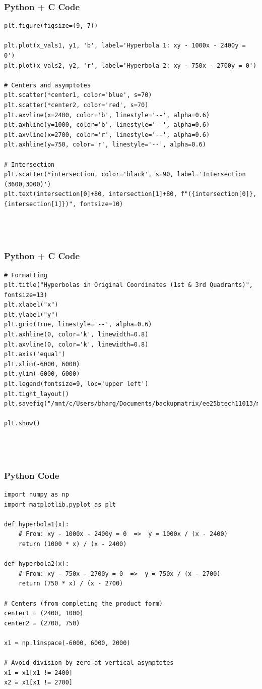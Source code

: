 \documentclass{beamer}
\begin{document}
\begin{frame}[fragile]
    \frametitle{Python + C Code}
    \begin{lstlisting}
plt.figure(figsize=(9, 7))

plt.plot(x_vals1, y1, 'b', label='Hyperbola 1: xy - 1000x - 2400y = 0')
plt.plot(x_vals2, y2, 'r', label='Hyperbola 2: xy - 750x - 2700y = 0')

# Centers and asymptotes
plt.scatter(*center1, color='blue', s=70)
plt.scatter(*center2, color='red', s=70)
plt.axvline(x=2400, color='b', linestyle='--', alpha=0.6)
plt.axhline(y=1000, color='b', linestyle='--', alpha=0.6)
plt.axvline(x=2700, color='r', linestyle='--', alpha=0.6)
plt.axhline(y=750, color='r', linestyle='--', alpha=0.6)

# Intersection
plt.scatter(*intersection, color='black', s=90, label='Intersection (3600,3000)')
plt.text(intersection[0]+80, intersection[1]+80, f"({intersection[0]}, {intersection[1]})", fontsize=10)




    \end{lstlisting}
\end{frame}
\begin{frame}[fragile]
    \frametitle{Python + C Code}
    \begin{lstlisting}
# Formatting
plt.title("Hyperbolas in Original Coordinates (1st & 3rd Quadrants)", fontsize=13)
plt.xlabel("x")
plt.ylabel("y")
plt.grid(True, linestyle='--', alpha=0.6)
plt.axhline(0, color='k', linewidth=0.8)
plt.axvline(0, color='k', linewidth=0.8)
plt.axis('equal')
plt.xlim(-6000, 6000)
plt.ylim(-6000, 6000)
plt.legend(fontsize=9, loc='upper left')
plt.tight_layout()
plt.savefig("/mnt/c/Users/bharg/Documents/backupmatrix/ee25btech11013/matgeo/12.27/figs/Figure_1.png")

plt.show()




    \end{lstlisting}
\end{frame}
\begin{frame}[fragile]
    \frametitle{Python Code}
    \begin{lstlisting}
import numpy as np
import matplotlib.pyplot as plt

def hyperbola1(x):
    # From: xy - 1000x - 2400y = 0  =>  y = 1000x / (x - 2400)
    return (1000 * x) / (x - 2400)

def hyperbola2(x):
    # From: xy - 750x - 2700y = 0  =>  y = 750x / (x - 2700)
    return (750 * x) / (x - 2700)

# Centers (from completing the product form)
center1 = (2400, 1000)
center2 = (2700, 750)

x1 = np.linspace(-6000, 6000, 2000)

# Avoid division by zero at vertical asymptotes
x1 = x1[x1 != 2400]
x2 = x1[x1 != 2700]



    \end{lstlisting}
\end{frame}
\end{document}
